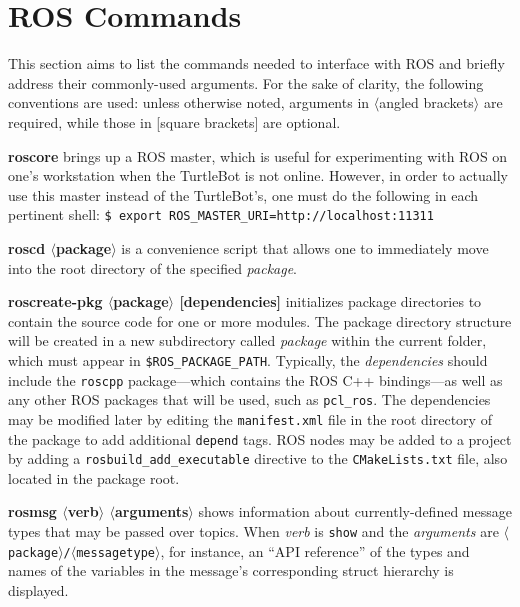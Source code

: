\documentclass[12pt]{report}
\begin{document}
\section{ROS Commands}
This section aims to list the commands needed to interface with ROS and briefly address their commonly-used arguments.  For the sake of clarity, the following conventions are used: unless otherwise noted, arguments in $\langle$angled brackets$\rangle$ are required, while those in [square brackets] are optional.
\begin{itemize}
\item{\textbf{roscore} brings up a ROS master, which is useful for experimenting with ROS on one's workstation when the TurtleBot is not online.  However, in order to actually use this master instead of the TurtleBot's, one must do the following in each pertinent shell: \texttt{\$\ export ROS\_MASTER\_URI=http://localhost:11311}}
\item{\textbf{roscd $\langle$package$\rangle$} is a convenience script that allows one to immediately move into the root directory of the specified \textit{package}.}
\item{\textbf{roscreate-pkg $\langle$package$\rangle$ [dependencies]} initializes package directories to contain the source code for one or more modules.  The package directory structure will be created in a new subdirectory called \textit{package} within the current folder, which must appear in \texttt{\$ROS\_PACKAGE\_PATH}.  Typically, the \textit{dependencies} should include the \texttt{roscpp} package---which contains the ROS C++ bindings---as well as any other ROS packages that will be used, such as \texttt{pcl\_ros}.  The dependencies may be modified later by editing the \texttt{manifest.xml} file in the root directory of the package to add additional \texttt{depend} tags.  ROS nodes may be added to a project by adding a \texttt{rosbuild\_add\_executable} directive to the \texttt{CMakeLists.txt} file, also located in the package root.}
\begin{sloppypar}
\item{\textbf{rosmsg $\langle$verb$\rangle$ $\langle$arguments$\rangle$} shows information about currently-defined message types that may be passed over topics.  When \textit{verb} is \texttt{show} and the \textit{arguments} are \texttt{$\langle$package$\rangle$/$\langle$messagetype$\rangle$}, for instance, an ``API reference'' of the types and names of the variables in the message's corresponding struct hierarchy is displayed.}
\end{sloppypar}

\end{itemize}
\end{document}
